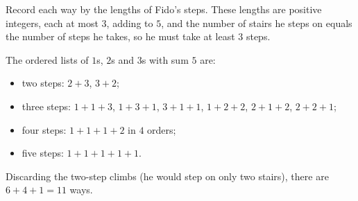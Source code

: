 Record each way by the lengths of Fido's steps. These lengths are positive integers, each at most $3$, adding to $5$, and the number of stairs he steps on equals the number of steps he takes, so he must take at least $3$ steps.

The ordered lists of $1$s, $2$s and $3$s with sum $5$ are:
\begin{itemize}
\item two steps: $2+3$, $3+2$;
\item three steps: $1+1+3$, $1+3+1$, $3+1+1$, $1+2+2$, $2+1+2$, $2+2+1$;
\item four steps: $1+1+1+2$ in $4$ orders;
\item five steps: $1+1+1+1+1$.
\end{itemize}
Discarding the two-step climbs (he would step on only two stairs), there are $6+4+1=\boxed{11}$ ways.
